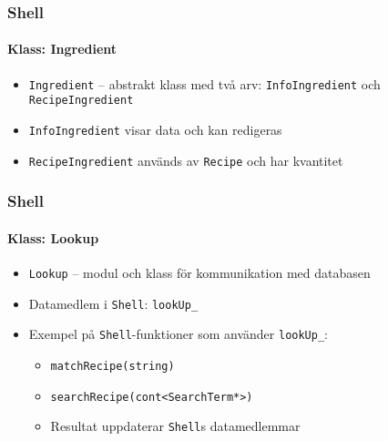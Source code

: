 \begin{frame}
  \frametitle{Shell}
  \framesubtitle{Klass: Ingredient}
  \begin{itemize}
  \item \texttt{Ingredient} -- abstrakt klass med två arv: \texttt{InfoIngredient} och \texttt{RecipeIngredient}
  \item<2-> \texttt{InfoIngredient} visar data och kan redigeras
  \item<3-> \texttt{RecipeIngredient} används av \texttt{Recipe} och har kvantitet
  \end{itemize}
\end{frame}

\begin{frame}
  \frametitle{Shell}
  \framesubtitle{Klass: Lookup}
  \begin{itemize}
  \item \texttt{Lookup} -- modul och klass för kommunikation med databasen
  \item<2-> Datamedlem i \texttt{Shell}: \texttt{lookUp\_}
  \item<3-> Exempel på \texttt{Shell}-funktioner som använder \texttt{lookUp\_}:
    \begin{itemize}
    \item \texttt{matchRecipe(string)}
    \item \texttt{searchRecipe(cont<SearchTerm*>)}
    \item Resultat uppdaterar \texttt{Shell}s datamedlemmar
    \end{itemize}
  \end{itemize}
\end{frame}

